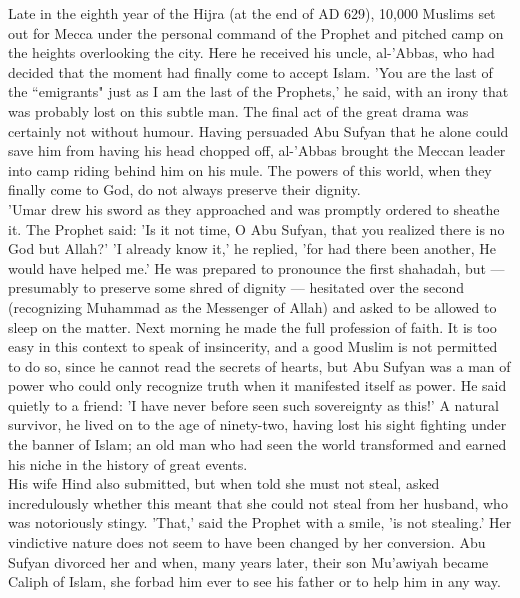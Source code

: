 \documentclass[10pt, twoside,openright]{book}
\begin{document}
Late in the eighth year of the Hijra (at the end of AD 629), 10,000 Muslims set out for Mecca under 
the personal command of the Prophet and pitched camp on the heights overlooking the city. Here he 
received his uncle, al\hyp{}'Abbas, who had decided that the moment had finally come to accept Islam. 'You 
are the last of the ``emigrants" just as I am the last of the Prophets,' he said, with an irony that 
was probably lost on this subtle man. The final act of the great drama was certainly not without 
humour. Having persuaded Abu Sufyan that he alone could save him from having his head chopped off, 
al-'Abbas brought the Meccan leader into camp riding behind him on his mule. The powers of this 
world, when they finally come to God, do not always preserve their dignity. \\

'Umar drew his sword as they approached and was promptly ordered to sheathe it. The Prophet said: 'Is 
it not time, O Abu Sufyan, that you realized there is no God but Allah?' 'I already know it,' he 
replied, 'for had there been another, He would have helped me.' He was prepared to pronounce the 
first shahadah, but --- presumably to preserve some shred of dignity --- hesitated over the second 
(recognizing Muhammad as the Messenger of Allah) and asked to be allowed to sleep on the matter. Next 
morning he made the full profession of faith. It is too easy in this context to speak of insincerity, 
and a good Muslim is not permitted to do so, since he cannot read the secrets of hearts, but Abu 
Sufyan was a man of power who could only recognize truth when it manifested itself as power. He said 
quietly to a friend: 'I have never before seen such sovereignty as this!' A natural survivor, he 
lived on to the age of ninety\hyp{}two, having lost his sight fighting under the banner of Islam; an old 
man who had seen the world transformed and earned his niche in the history of great events. \\

His wife Hind also submitted, but when told she must not steal, asked incredulously whether this 
meant that she could not steal from her husband, who was notoriously stingy. 'That,' said the Prophet 
with a smile, 'is not stealing.' Her vindictive nature does not seem to have been changed by her 
conversion. Abu Sufyan divorced her and when, many years later, their son Mu'awiyah became Caliph of 
Islam, she forbad him ever to see his father or to help him in any way. \\
\end{document}
